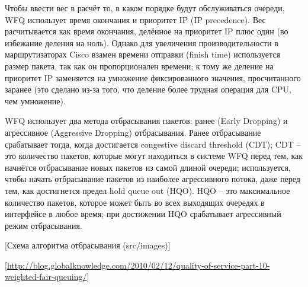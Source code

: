 	Чтобы ввести вес в расчёт то, в каком порядке будут обслуживаться очереди,
	WFQ использует время окончания и приоритет IP (IP precedence). Вес расчитывается
	как время окончания, делённое на приоритет IP плюс один (во избежание деления
	на ноль). Однако для увеличения производительности в маршрутизаторах Cisco
	взамен времени отправки (finish time) используется размер пакета, так как он
	пропорционален времени; к тому же деление на приоритет IP заменяется на умножение
	фиксированного значения, просчитанного заранее (это сделано из-за того,
	что деление более трудная операция для CPU, чем умножение).

	WFQ использует два метода отбрасывания пакетов: ранее (Early Dropping) и агрессивное
	(Aggressive Dropping) отбрасывания. Ранее отбрасывание срабатывает тогда, когда
	достигается congestive discard threshold (CDT); CDT -- это количество пакетов, которые могут
	находиться в системе WFQ перед тем, как начнётся отбрасывание новых пакетов
	из самой длиной очереди; используется, чтобы начать отбрасывание пакетов
	из наиболее агрессивного потока, даже перед тем, как достигнется предел
	hold queue out (HQO). HQO -- это максимальное количество пакетов, которое может быть
	во всех выходящих очередях в интерфейсе в любое время; при достижении HQO
	срабатывает агрессивный режим отбрасывания.

	[Схема алгоритма отбрасывания (src/images)]

	[\url{http://blog.globalknowledge.com/2010/02/12/quality-of-service-part-10-weighted-fair-queuing/}]

	 

